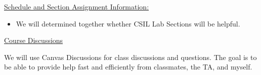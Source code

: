 %  
%  
%
%  
%
\noindent \underline{Schedule and Section Assignment Information:}

  \begin{itemize}

    \item We will determined together whether CSIL Lab Sections will be helpful. 

  \end{itemize}
  


\noindent \underline{Course Discussions}

\noindent We will use Canvas Discussions for class discussions and questions. The goal is to be able to provide help fast and efficiently from classmates, the TA, and myself. 

